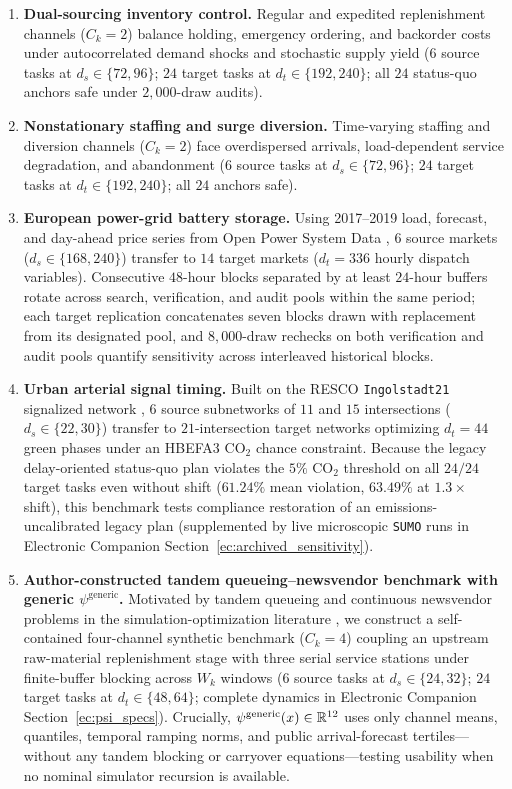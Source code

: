 \begin{enumerate}
  \item \textbf{Dual-sourcing inventory control.} Regular and expedited replenishment channels ($C_k=2$) balance holding, emergency ordering, and backorder costs under autocorrelated demand shocks and stochastic supply yield ($6$ source tasks at $d_s\in\{72,96\}$; $24$ target tasks at $d_t\in\{192,240\}$; all $24$ status-quo anchors safe under $2{,}000$-draw audits).
  \item \textbf{Nonstationary staffing and surge diversion.} Time-varying staffing and diversion channels ($C_k=2$) face overdispersed arrivals, load-dependent service degradation, and abandonment \citep{halfin1981heavy} ($6$ source tasks at $d_s \in \{72, 96\}$; $24$ target tasks at $d_t \in \{192, 240\}$; all $24$ anchors safe).
  \item \textbf{European power-grid battery storage.} Using 2017--2019 load, forecast, and day-ahead price series from Open Power System Data \citep{opsd2020timeseries}, $6$ source markets ($d_s\in\{168,240\}$) transfer to $14$ target markets ($d_t=336$ hourly dispatch variables). Consecutive $48$-hour blocks separated by at least $24$-hour buffers rotate across search, verification, and audit pools within the same period; each target replication concatenates seven blocks drawn with replacement from its designated pool, and $8{,}000$-draw rechecks on both verification and audit pools quantify sensitivity across interleaved historical blocks.
  \item \textbf{Urban arterial signal timing.} Built on the RESCO \texttt{Ingolstadt21} signalized network \citep{ault2021reinforcement}, $6$ source subnetworks of $11$ and $15$ intersections ($d_s \in \{22, 30\}$) transfer to $21$-intersection target networks optimizing $d_t = 44$ green phases under an HBEFA3 $\mathrm{CO}_2$ chance constraint. Because the legacy delay-oriented status-quo plan violates the $5\%$ $\mathrm{CO}_2$ threshold on all $24/24$ target tasks even without shift ($61.24\%$ mean violation, $63.49\%$ at $1.3\times$ shift), this benchmark tests compliance restoration of an emissions-uncalibrated legacy plan (supplemented by live microscopic \texttt{SUMO} runs in Electronic Companion Section~\ref*{ec:archived_sensitivity}).
  \item \textbf{Author-constructed tandem queueing--newsvendor benchmark with generic $\psi^{\mathrm{generic}}$.} Motivated by tandem queueing and continuous newsvendor problems in the simulation-optimization literature \citep[distinct from SimOpt's single-period Burr~XII newsvendor;][]{koenig1985procedure,hong2015chance,eckman2023diagnostic}, we construct a self-contained four-channel synthetic benchmark ($C_k=4$) coupling an upstream raw-material replenishment stage with three serial service stations under finite-buffer blocking across $W_k$ windows ($6$ source tasks at $d_s \in \{24, 32\}$; $24$ target tasks at $d_t \in \{48, 64\}$; complete dynamics in Electronic Companion Section~\ref*{ec:psi_specs}). Crucially, $\psi^{\mathrm{generic}}(x) \in \mathbb{R}^{12}$ uses only channel means, quantiles, temporal ramping norms, and public arrival-forecast tertiles—without any tandem blocking or carryover equations—testing usability when no nominal simulator recursion is available.

\end{enumerate}

